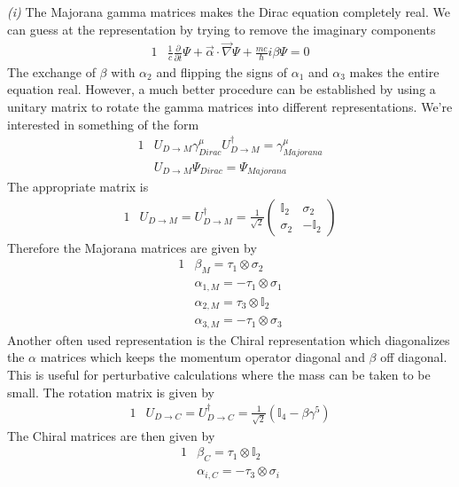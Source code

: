 \documentclass[]{article}
\numberwithin{equation}{subsection}
\begin{document}
\noindent\emph{(i)} The Majorana gamma matrices makes the Dirac equation completely real. We can guess at the representation by trying to remove the imaginary components
\begin{alignat}{1}
  \label{i72} &\frac{1}{c}\frac{\partial}{\partial t}\Psi+\vec{\alpha}\cdot\vec{\nabla}\Psi+\frac{mc}{\hbar}i\beta\Psi=0
\end{alignat}
The exchange of $\beta$ with $\alpha_{2}$ and flipping the signs of $\alpha_{1}$ and $\alpha_{3}$ makes the entire equation real. However, a much better procedure can be established by using a unitary matrix to rotate the gamma matrices into different representations. We're interested in something of the form
\begin{alignat}{1}
  \label{i73} &U_{D\rightarrow M}\gamma_{Dirac}^{\mu}U_{D\rightarrow M}^{\dagger}=\gamma_{Majorana}^{\mu}\\
  \label{i74} &U_{D\rightarrow M}\Psi_{Dirac}=\Psi_{Majorana}
\end{alignat}
The appropriate matrix is
\begin{alignat}{1}
  \label{i75} &U_{D\rightarrow M}=U_{D\rightarrow M}^{\dagger}=\frac{1}{\sqrt{2}}
  \begin{pmatrix}
    \mathbb{I}_{2}&\sigma_{2}\\
    \sigma_{2}&-\mathbb{I}_{2}
  \end{pmatrix}
\end{alignat}
Therefore the Majorana matrices are given by
\begin{alignat}{1}
  \label{i76} &\beta_{M}=\tau_{1}\otimes\sigma_{2}\\
  \label{i77} &\alpha_{1,M}=-\tau_{1}\otimes\sigma_{1}\\
  \label{i78} &\alpha_{2,M}=\tau_{3}\otimes\mathbb{I}_{2}\\
  \label{i79} &\alpha_{3,M}=-\tau_{1}\otimes\sigma_{3}
\end{alignat}
Another often used representation is the Chiral representation which diagonalizes the $\alpha$ matrices which keeps the momentum operator diagonal and $\beta$ off diagonal. This is useful for perturbative calculations where the mass can be taken to be small. The rotation matrix is given by
\begin{alignat}{1}
  \label{i80} &U_{D\rightarrow C}=U_{D\rightarrow C}^{\dagger}=\frac{1}{\sqrt{2}}(\mathbb{I}_{4}-\beta\gamma^{5})
\end{alignat}
The Chiral matrices are then given by
\begin{alignat}{1}
  \label{i81} &\beta_{C}=\tau_{1}\otimes\mathbb{I}_{2}\\
  \label{i82} &\alpha_{i,C}=-\tau_{3}\otimes\sigma_{i}
\end{alignat}
\end{document}
